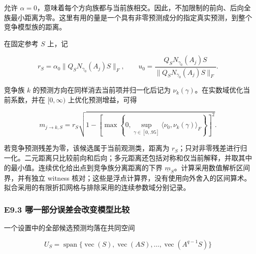 \documentclass[11pt,a4paper]{article}
\begin{document}
允许
\(\alpha=0\)，意味着每个方向族都与当前族相交。因此，不加限制的前向、后向全族最小距离为零。这里有用的量是一个具有非零预测成分的指定真实预测，到整个竞争模型族的距离。

\par
\noindent\begin{minipage}{\linewidth}

在固定参考 \(S\) 上，记

\[
r_S=\alpha_0\|Q_SN_{\gamma_0}(A_j)S\|_F,
\qquad
u_0=\frac{Q_SN_{\gamma_0}(A_j)S}{\|Q_SN_{\gamma_0}(A_j)S\|_F}.
\]

\end{minipage}\par

\par
\noindent\begin{minipage}{\linewidth}

竞争族 \(k\) 的预测方向在同样消去当前项并归一化后记为
\(\nu_k(\gamma)\)。在实数域优化当前系数，并在 \([0,\infty)\)
上优化预测增益，可得

\[
m_{j\rightarrow k,S}
=r_S\sqrt{1-\left[\max\left\{0,
\sup_{\gamma\in[0,.95]}\langle\nu_0,\nu_k(\gamma)\rangle_F
\right\}\right]^2}.
\]

\end{minipage}\par

若竞争预测残差为零，该候选属于当前观测类，距离为
\(r_S\)；只对非零残差进行归一化。二元距离只比较前向和后向；多元距离还包括对称和仅当前解释，并取其中的最小值。连续优化给出点到竞争族分离距离的下界
\(\underline m_S\)。计算采用数值解析区间界，并有独立 witness
核对；这些是浮点计算界，没有使用向外舍入的区间算术。拟合采用的有限折扣网格与排除采用的连续参数域分别记录。

\subsubsection{E9.3
哪一部分误差会改变模型比较}\label{e9.3-ux54eaux4e00ux90e8ux5206ux8befux5deeux4f1aux6539ux53d8ux6a21ux578bux6bd4ux8f83}

\par
\noindent\begin{minipage}{\linewidth}

一个设置中的全部候选预测均落在共同空间

\[
U_S=\operatorname{span}\{\operatorname{vec}(S),
\operatorname{vec}(AS),\ldots,\operatorname{vec}(A^{q-1}S)\}
\]

\end{minipage}\par
\end{document}
